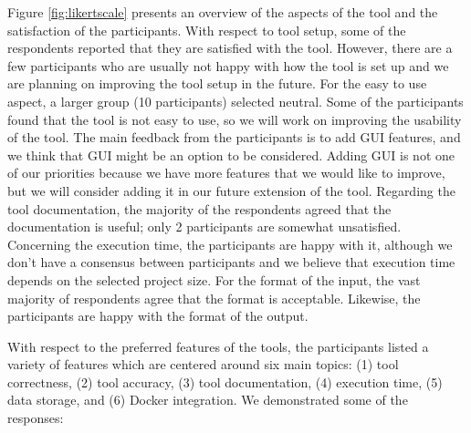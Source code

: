 \documentclass[3p]{elsarticle}
\begin{document}
 Figure \ref{fig:likertscale}  presents an overview of the aspects of the tool and the satisfaction of the participants. With respect to tool setup, some of the respondents reported that they are satisfied with the tool. However, there are a few participants who are usually not happy with how the tool is set up and we are planning on improving the tool setup in the future. For the easy to use aspect, a larger group (10 participants)  selected neutral. Some of the participants found that the tool is not easy to use, so we will work on improving the usability of the tool. The main feedback from the participants is to add GUI features, and we think that GUI might be an option to be considered. Adding GUI is not one of our priorities because we have more features that we would like to improve, but we will consider adding it in our future extension of the tool. Regarding the tool documentation, the majority of the respondents agreed that the documentation is useful; only 2 participants are somewhat unsatisfied. Concerning the execution time, the participants are happy with it, although we don’t have a consensus between participants and we believe that execution time depends on the selected project size. For the format of the input, the vast majority of respondents agree that the format is acceptable. Likewise, the participants are happy with the format of the output.
  
 With respect to the preferred features of the tools, the participants listed a variety of features which are centered around six main topics: (1) tool correctness, (2) tool accuracy, (3) tool documentation, (4) execution time, (5) data storage, and (6) Docker integration. We demonstrated some of the responses:
 
\end{document}
